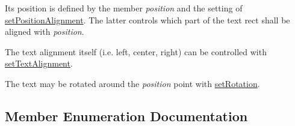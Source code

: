  Its position is defined by the member {\itshape position} and the setting of \hyperlink{class_q_c_p_item_text_a781cdf8c640fc6a055dcff1e675c8c7a}{set\+Position\+Alignment}. The latter controls which part of the text rect shall be aligned with {\itshape position}.

The text alignment itself (i.\+e. left, center, right) can be controlled with \hyperlink{class_q_c_p_item_text_ab5bc0684c4d1bed81949a11b34dba478}{set\+Text\+Alignment}.

The text may be rotated around the {\itshape position} point with \hyperlink{class_q_c_p_item_text_a4bcc10cd97952c3f749d75824b5077f0}{set\+Rotation}. 

\subsection{Member Enumeration Documentation}
\hypertarget{class_q_c_p_item_text_a14a84e58f72519c8ae1d7a4a1dd23f21}{}
